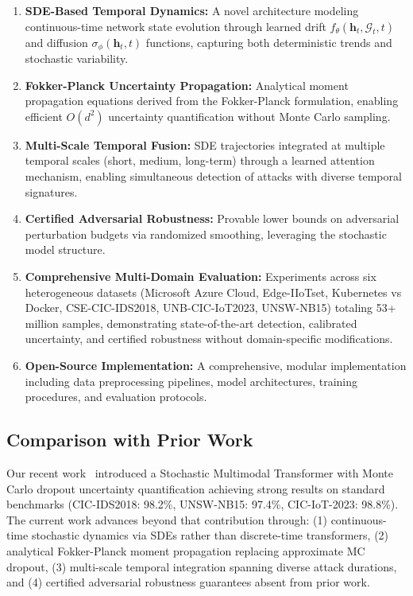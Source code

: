 \documentclass[10pt,journal,compsoc]{IEEEtran}
\newcommand{\G}{\mathcal{G}}
\begin{document}
\begin{enumerate}[leftmargin=*]
\item \textbf{SDE-Based Temporal Dynamics:} A novel architecture modeling continuous-time network state evolution through learned drift $f_\theta(\mathbf{h}_t, \G_t, t)$ and diffusion $\sigma_\phi(\mathbf{h}_t, t)$ functions, capturing both deterministic trends and stochastic variability.

\item \textbf{Fokker-Planck Uncertainty Propagation:} Analytical moment propagation equations derived from the Fokker-Planck formulation, enabling efficient $O(d^2)$ uncertainty quantification without Monte Carlo sampling.

\item \textbf{Multi-Scale Temporal Fusion:} SDE trajectories integrated at multiple temporal scales (short, medium, long-term) through a learned attention mechanism, enabling simultaneous detection of attacks with diverse temporal signatures.

\item \textbf{Certified Adversarial Robustness:} Provable lower bounds on adversarial perturbation budgets via randomized smoothing, leveraging the stochastic model structure.

\item \textbf{Comprehensive Multi-Domain Evaluation:} Experiments across six heterogeneous datasets (Microsoft Azure Cloud, Edge-IIoTset, Kubernetes vs Docker, CSE-CIC-IDS2018, UNB-CIC-IoT2023, UNSW-NB15) totaling 53+ million samples, demonstrating state-of-the-art detection, calibrated uncertainty, and certified robustness without domain-specific modifications.

\item \textbf{Open-Source Implementation:} A comprehensive, modular implementation including data preprocessing pipelines, model architectures, training procedures, and evaluation protocols.
\end{enumerate}

\vspace{-0.2cm}
\subsection{Comparison with Prior Work}

Our recent work~\cite{anaedevha2026stochastic} introduced a Stochastic Multimodal Transformer with Monte Carlo dropout uncertainty quantification achieving strong results on standard benchmarks (CIC-IDS2018: 98.2\%, UNSW-NB15: 97.4\%, CIC-IoT-2023: 98.8\%). The current work advances beyond that contribution through: (1) continuous-time stochastic dynamics via SDEs rather than discrete-time transformers, (2) analytical Fokker-Planck moment propagation replacing approximate MC dropout, (3) multi-scale temporal integration spanning diverse attack durations, and (4) certified adversarial robustness guarantees absent from prior work.
\end{document}
